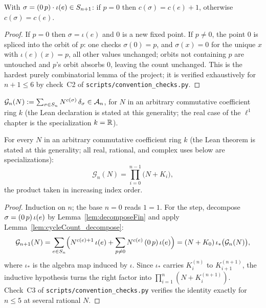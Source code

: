 \begin{lemma}\label{lem:cycleCount_decompose}
\leanok
{}
With $\sigma=(0\,p)\cdot\iota(e)\in S_{n+1}$: if $p=0$ then
$c(\sigma)=c(e)+1$, otherwise $c(\sigma)=c(e)$.
\end{lemma}
\begin{proof}
\leanok
{}
If $p=0$ then $\sigma=\iota(e)$ and $0$ is a new fixed point. If
$p\neq0$, the point $0$ is spliced into the orbit of $p$: one checks
$\sigma(0)=p$, and $\sigma(x)=0$ for the unique $x$ with $\iota(e)(x)=p$,
all other values unchanged; orbits not containing $p$ are untouched and
$p$'s orbit absorbs $0$, leaving the count unchanged. This is the hardest
purely combinatorial lemma of the project; it is verified exhaustively
for $n+1\le6$ by check~C2 of \texttt{scripts/convention\_checks.py}.
\end{proof}

\begin{definition}\label{def:gram}
\leanok
{}
$\mathcal G_n(N):=\sum_{\sigma\in S_n}N^{c(\sigma)}\,\delta_\sigma
\in\mathcal{A}_{n}$, for $N$ in an arbitrary commutative coefficient ring $k$
(the Lean declaration is stated at this generality; the real case of the
$\ell^1$ chapter is the specialization $k=\mathbb{R}$).
\end{definition}

\begin{theorem}\label{thm:jucys}
\leanok
{}
For every $N$ in an arbitrary commutative coefficient ring $k$ (the Lean
theorem is stated at this generality; all real, rational, and complex
uses below are specializations):
\[
\mathcal G_n(N)=\prod_{i=0}^{n-1}\bigl(N+K_i\bigr),
\]
the product taken in increasing index order.
\end{theorem}
\begin{proof}
\leanok
{}
Induction on $n$; the base $n=0$ reads $1=1$. For the step, decompose
$\sigma=(0\,p)\,\iota(e)$ by Lemma~\ref{lem:decomposeFin} and apply
Lemma~\ref{lem:cycleCount_decompose}:
\[
\mathcal G_{n+1}(N)
=\sum_{e\in S_n}\Bigl(N^{c(e)+1}\,\iota(e)
+\sum_{p\neq0}N^{c(e)}\,(0\,p)\,\iota(e)\Bigr)
=(N+K_0)\,\iota_*\bigl(\mathcal G_n(N)\bigr),
\]
where $\iota_*$ is the algebra map induced by $\iota$. Since
$\iota_*$ carries $K_i^{(n)}$ to $K_{i+1}^{(n+1)}$, the inductive
hypothesis turns the right factor into
$\prod_{i=1}^{n}(N+K_i^{(n+1)})$. Check~C3 of
\texttt{scripts/convention\_checks.py} verifies the identity exactly for
$n\le5$ at several rational $N$.
\end{proof}

